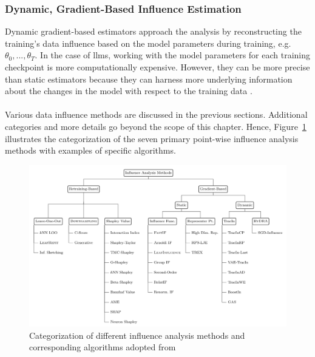 \subsubsection{Dynamic, Gradient-Based Influence Estimation} \label{subsubsec:dynamic_gradient_based_influence_estimation}
Dynamic gradient-based estimators approach the analysis by reconstructing the training's data influence based on the model parameters during training, e.g. $\theta_0,...,\theta_T$. In the case of \acrlong{llm}s, working with the model parameters for each training checkpoint is more computationally expensive. However, they can be more precise than static estimators because they can harness more underlying information about the changes in the model with respect to the training data \cite{Hammoudeh_2024}.
\\\\
Various data influence methods are discussed in the previous sections. Additional categories and more details go beyond the scope of this chapter. Hence, Figure~\ref{fig:influence_analysis_methods} illustrates the categorization of the seven primary point-wise influence analysis methods with examples of specific algorithms.
\begin{figure}[ht]
    \centering
    \includegraphics[width=1\textwidth]{figures/influence_analysis_methods.png}
    \caption{Categorization of different influence analysis methods and corresponding algorithms adopted from \cite{wang2024datashapleytrainingrun}}
    \label{fig:influence_analysis_methods}
\end{figure}

